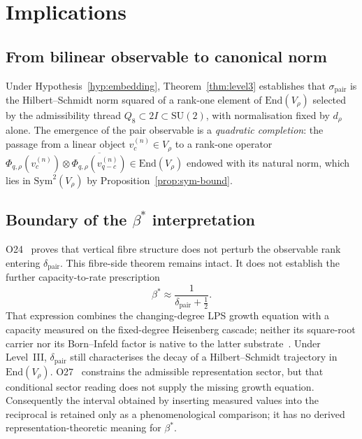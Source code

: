 \documentclass[12pt,a4paper]{article}
\theoremstyle{definition}
\theoremstyle{remark}
\begin{document}
  \section{Implications}
  \label{sec:implications}

  \subsection{From bilinear observable to canonical norm}
    \label{sec:impl-norm}

    Under Hypothesis~\ref{hyp:embedding}, Theorem~\ref{thm:level3} establishes that
    $\sigma_{\mathrm{pair}}$ is the Hilbert--Schmidt norm squared of a rank-one element
    of $\mathrm{End}(V_\rho)$ selected by the admissibility thread
    $Q_8 \subset 2I \subset \mathrm{SU}(2)$, with normalisation fixed by $d_\rho$ alone.
    The emergence of the pair observable is a \emph{quadratic completion}: the passage
    from a linear object $v_c^{(n)} \in V_\rho$ to a rank-one operator
    $\Phi_{q,\rho}(v_c^{(n)}) \otimes \overline{\Phi_{q,\rho}(v_{q-c}^{(n)})}
    \in \mathrm{End}(V_\rho)$ endowed with its natural norm, which lies in $\mathrm{Sym}^2(V_\rho)$ by
    Proposition~\ref{prop:sym-bound}.

  \subsection{Boundary of the $\beta^*$ interpretation}
    \label{sec:impl-beta}

    O24~\cite{Beau2026a28} proves that vertical fibre structure does not perturb the
    observable rank entering $\delta_{\mathrm{pair}}$.  This fibre-side theorem remains intact.
    It does not establish the further capacity-to-rate prescription
    \begin{equation}
      \beta^* \approx \frac{1}{\delta_{\mathrm{pair}} + \tfrac{1}{2}}.
    \end{equation}
    That expression combines the changing-degree LPS growth equation with a capacity
    measured on the fixed-degree Heisenberg cascade; neither its square-root carrier nor
    its Born--Infeld factor is native to the latter substrate~\cite{Beau2026sgn}.
    Under Level~III, $\delta_{\mathrm{pair}}$ still characterises the decay of a
    Hilbert--Schmidt trajectory in $\mathrm{End}(V_\rho)$.  O27~\cite{Beau2026a31}
    constrains the admissible representation sector, but that conditional sector reading does
    not supply the missing growth equation.  Consequently the interval obtained by
    inserting measured values into the reciprocal is retained only as a phenomenological
    comparison; it has no derived representation-theoretic meaning for $\beta^*$.
\end{document}
